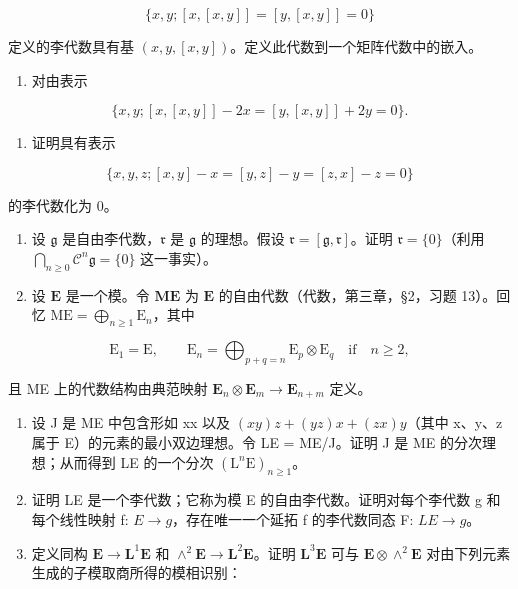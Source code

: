 \[
\{x, y; [ x, [ x, y ] ] = [ y, [ x, y ] ] = 0 \}
\]

定义的李代数具有基 \((x,y,[x,y])\)。定义此代数到一个矩阵代数中的嵌入。

\begin{enumerate}
\def\labelenumi{(\alph{enumi})}
\setcounter{enumi}{1}
\tightlist
\item
  对由表示
\end{enumerate}

\[
\{x, y; [ x, [ x, y ] ] - 2 x = [ y, [ x, y ] ] + 2 y = 0 \}.
\]

\begin{enumerate}
\def\labelenumi{(\alph{enumi})}
\setcounter{enumi}{2}
\tightlist
\item
  证明具有表示
\end{enumerate}

\[
\{x, y, z; [ x, y ] - x = [ y, z ] - y = [ z, x ] - z = 0 \}
\]

的李代数化为 0。

\begin{enumerate}
\def\labelenumi{\arabic{enumi}.}
\setcounter{enumi}{4}
\item
  设 \(\mathfrak{g}\) 是自由李代数，\(\mathfrak{r}\) 是 \(\mathfrak{g}\) 的理想。假设 \(\mathfrak{r} = [\mathfrak{g},\mathfrak{r}]\)。证明 \(\mathfrak{r} = \{0\}\)（利用 \(\bigcap_{n\geqslant 0}\mathcal{C}^n\mathfrak{g} = \{0\}\) 这一事实）。
\item
  设 \(\mathbf{E}\) 是一个模。令 \(\mathbf{ME}\) 为 \(\mathbf{E}\) 的自由代数（代数，第三章，§2，习题 13）。回忆 \(\mathrm{ME} = \bigoplus_{n\geqslant 1}\mathrm{E}_n\)，其中
\end{enumerate}

\[
\mathrm{E} _ {1} = \mathrm{E}, \qquad \mathrm{E} _ {n} = \bigoplus_ {p + q = n} \mathrm{E} _ {p} \otimes \mathrm{E} _ {q} \quad \text {if} \quad n \geqslant 2,
\]

且 ME 上的代数结构由典范映射 \(\mathbf{E}_n\otimes \mathbf{E}_m\to \mathbf{E}_{n + m}\) 定义。

\begin{enumerate}
\def\labelenumi{(\alph{enumi})}
\item
  设 J 是 ME 中包含形如 xx 以及 \((xy)z + (yz)x + (zx)y\)（其中 x、y、z 属于 E）的元素的最小双边理想。令 LE = ME/J。证明 J 是 ME 的分次理想；从而得到 LE 的一个分次 \((\mathrm{L}^{n}\mathrm{E})_{n\geqslant1}\)。
\item
  证明 LE 是一个李代数；它称为模 E 的自由李代数。证明对每个李代数 g 和每个线性映射 f: \(E \to g\)，存在唯一一个延拓 f 的李代数同态 F: \(LE \to g\)。
\item
  定义同构 \(\mathbf{E} \to \mathbf{L}^1\mathbf{E}\) 和 \(\wedge^2\mathbf{E} \to \mathbf{L}^2\mathbf{E}\)。证明 \(\mathbf{L}^3\mathbf{E}\) 可与 \(\mathbf{E} \otimes \wedge^2\mathbf{E}\) 对由下列元素生成的子模取商所得的模相识别：
\end{enumerate}

